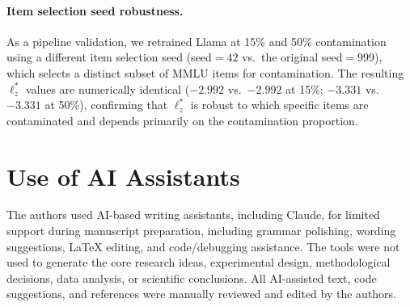\paragraph{Item selection seed robustness.}
As a pipeline validation, we retrained Llama at 15\% and 50\% contamination using a different item selection seed (seed${=}42$ vs.\ the original seed${=}999$), which selects a distinct subset of MMLU items for contamination.
The resulting $\ell_z^*$ values are numerically identical ($-2.992$ vs.\ $-2.992$ at 15\%; $-3.331$ vs.\ $-3.331$ at 50\%), confirming that $\ell_z^*$ is robust to which specific items are contaminated and depends primarily on the contamination proportion.

\section{Use of AI Assistants}
\label{app:ai-assistants}

The authors used AI-based writing assistants, including Claude, for limited support during manuscript preparation, including grammar polishing, wording suggestions, LaTeX editing, and code/debugging assistance. The tools were not used to generate the core research ideas, experimental design, methodological decisions, data analysis, or scientific conclusions. All AI-assisted text, code suggestions, and references were manually reviewed and edited by the authors.
